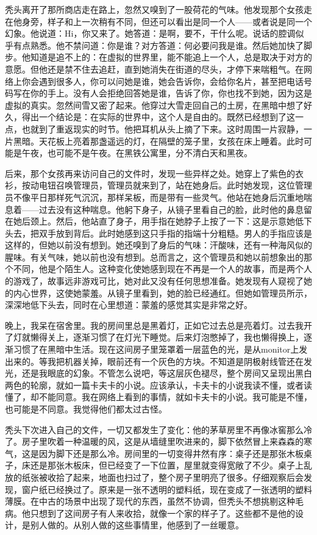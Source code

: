 秃头离开了那所商店走在路上，忽然又嗅到了一股荷花的气味。他发现那个女孩走在他身旁，样子和上一次稍有不同，但还可以看出是同一个人——或者说是同一个幻象。他说道：Hi，你又来了。她答道：是啊，要不，干什么呢。说话的腔调似乎有点熟悉。他不禁问道：你是谁？对方答道：何必要问我是谁。然后她加快了脚步。他知道是追不上的：在虚拟的世界里，能不能追上一个人，总是取决于对方的意愿。但他还是禁不住去追赶，直到她消失在街道的尽头，才停下来喘粗气。在网络上你会遇到很多人，你可以问她是谁，她会告诉你，会给你名片，甚至把电话号码写在你的手上。没有人会拒绝回答她是谁，告诉了你，你也找不到她，因为这是虚拟的真实。忽然间雪又密了起来。他穿过大雪走回自己的土房，在黑暗中想了好久，得出一个结论是：在实际的世界中，这个人是自由的。既然已经想到了这一点，也就到了重返现实的时节。他把耳机从头上摘了下来。这时周围一片寂静，一片黑暗。天花板上亮着那盏遥远的灯，在隔壁的笼子里，女孩在床上睡着。此时可能是午夜，也可能不是午夜。在黑铁公寓里，分不清白天和黑夜。 



后来，那个女孩再来访问自己的文件时，发现一些异样之处。她穿上了紫色的衣衫，按动电钮召唤管理员，管理员就来到了，站在她身后。此时她发现，这位管理员不像平日那样死气沉沉，那样呆板，而是带有一些灵气。他站在她身后沉重地喘息着——过去没有这种喘息。他躬下身子，从镜子里看自己的脸，此时他的鼻息留在她后颈上。然后，他站直了身子，用手指在她脖子上按了一下：这是示意她低下头去，把双手放到背后。此时她感到这只手指的指端十分粗糙。男人的手指应该是这样的，但她以前没有想到。她还嗅到了身后的气味：汗酸味，还有一种海风似的腥味。有关气味，她以前也没有想到。总而言之，这个管理员和她以前想象出的那个不同，他是个陌生人。这种变化使她感到现在不再是一个人的故事，而是两个人的游戏了，故事远非游戏可比，她对此又没有任何思想准备。她发现有人窥视了她的内心世界，这使她蒙羞。从镜子里看到，她的脸已经通红。但她如管理员所示，深深地低下头去，同时在心里想道：蒙羞的感觉其实是非常之好。 



晚上，我呆在宿舍里。我的房间里总是黑着灯，正如它过去总是亮着灯。过去我开了灯就懒得关上，逐渐习惯了在灯光下睡觉。后来灯泡憋掉了，我也懒得换上，逐渐习惯了在黑暗中生活。现在这间房子里笼罩着一层蓝色的光，是从monitor上发出来的。等我把机器关掉，眼前还有一个灰色的方块。不知道是阴极射线管还在发光，还是我眼底的幻象。不管怎么说吧，等这层灰色褪尽，整个房间又呈现出黑白两色的轮廓，就如一篇卡夫卡的小说。应该承认，卡夫卡的小说我读不懂，或者读懂了，却不能同意。我在网络上看到的事情，就如卡夫卡的小说。我可能是不懂，也可能是不同意。我觉得他们都太过古怪。 

秃头下次进入自己的文件，一切又都发生了变化：他的茅草房里不再像冰窖那么冷了。房子里吹着一种温暖的风，这是从墙缝里吹进来的，脚下依然冒上来森森的寒气，这是因为脚下还是那么冷。房间里的一切变得井然有序：桌子还是那张木板桌子，床还是那张木板床，但已经变了一下位置，屋里就变得宽敞了不少。桌子上乱放的纸张被收拾了起来，地面也扫过了，整个房子里明亮了很多。仔细观察后会发现，窗户纸已经换过了。原来是一张不透明的塑料纸，现在变成了一张透明的塑料薄膜。在中古的场景中出现了现代的东西，虽然不协调，但秃头不想挑剔这种毛病。他只想到了这间房子有人来收拾，就像一个家的样子了。这些都不是他的设计，是别人做的。从别人做的这些事情里，他感到了一丝暖意。 

